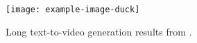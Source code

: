 \begin{figure}[h!]
    \centering    
    \texttt{[image: example-image-duck]}
    \caption{Long text-to-video generation results from \sname.
    }
    \label{fig:teaser}
\end{figure}